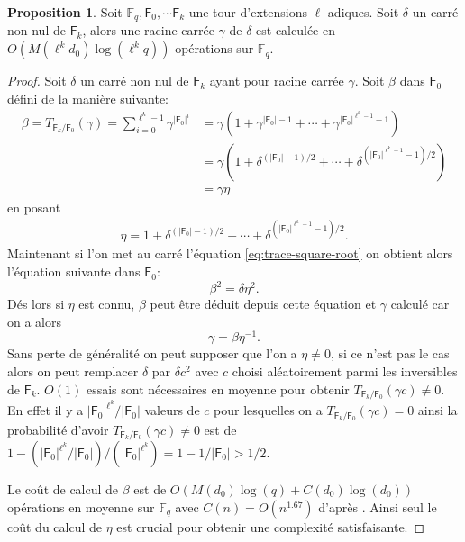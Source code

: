 \documentclass[10pt,a4paper]{book}
\theoremstyle{plain}
\theoremstyle{definition}
\theoremstyle{definition}
\theoremstyle{definition}
\newtheorem{prop}[thm]{Proposition}
\theoremstyle{definition}
\theoremstyle{remark}
\theoremstyle{remark}
\theoremstyle{definition}
\begin{document}
\begin{prop}
Soit $\mathbb{F}_q, \mathsf{F}_0, \cdots \mathsf{F}_k$ une tour d'extensions $\ell$-adiques. Soit $\delta$ un carré non nul de $\mathsf{F}_k$, alors une racine carrée $\gamma$ de $\delta$ est calculée en $O(M(\ell^kd_0)\log(\ell^kq))$ opérations sur $\mathbb{F}_q$.
\end{prop}

\begin{proof}
Soit $\delta$ un carré non nul de $\mathsf{F}_k$ ayant pour racine carrée $\gamma$. Soit $\beta$ dans $\mathsf{F}_0$ défini de la manière suivante:
\begin{align}
\label{eq:trace-square-root}
\beta=T_{\mathsf{F}_k/\mathsf{F}_0}(\gamma)=\sum_{i=0}^{\ell^k-1}\gamma^{|\mathsf{F}_0|^i}&=\gamma(1+\gamma^{|\mathsf{F}_0|-1}+\cdots+ \gamma^{|\mathsf{F}_0|^{\ell^k-1}-1} ) \\
&=\gamma(1+\delta^{(|\mathsf{F}_0|-1)/2}+\cdots+ \delta^{(|\mathsf{F}_0|^{\ell^k-1}-1)/2}) \\
&=\gamma \eta
\end{align}
en posant 
\begin{align*}
\eta=1+\delta^{(|\mathsf{F}_0|-1)/2}+\cdots+ \delta^{(|\mathsf{F}_0|^{\ell^k-1}-1)/2}.
\end{align*}
Maintenant si l'on met au carré l'équation \eqref{eq:trace-square-root} on obtient alors l'équation suivante dans $\mathsf{F}_0$: 
\begin{equation*}
\beta^2=\delta \eta^2. 
\end{equation*}
Dés lors si $\eta$ est connu, $\beta$ peut être déduit depuis cette équation et $\gamma$ calculé car on a alors
\begin{equation*}
 \gamma=\beta \eta^{-1}.
\end{equation*}
Sans perte de généralité on peut supposer que l'on a $\eta \neq 0$, si ce n'est pas le cas alors on peut remplacer $\delta$ par $\delta c^2$ avec $c$ choisi aléatoirement parmi les inversibles de $\mathsf{F}_k$.
$O(1)$ essais sont nécessaires en moyenne pour obtenir $T_{\mathsf{F}_k/\mathsf{F}_0}(\gamma c) \neq 0$. En effet il y a $|\mathsf{F}_0|^{\ell^k}/|\mathsf{F}_0|$ valeurs de $c$ pour lesquelles on a $T_{\mathsf{F}_k/\mathsf{F}_0}(\gamma c) = 0$ ainsi la probabilité d'avoir $T_{\mathsf{F}_k/\mathsf{F}_0}(\gamma c) \neq 0$ est de $1-(|\mathsf{F}_0|^{\ell^k}/|\mathsf{F}_0|)/(|\mathsf{F}_0|^{\ell^k})=1-1/|\mathsf{F}_0|>1/2$.

Le coût de calcul de $\beta$ est de $O(M(d_0)\log(q)+C(d_0)\log(d_0))$ opérations en moyenne sur $\mathbb{F}_q$ avec $C(n)=O(n^{1.67})$ d'après \cite{doliskani_Schost_2014_root}. Ainsi seul le coût du calcul de $\eta$ est crucial pour obtenir une complexité satisfaisante.


\end{proof}
\end{document}
